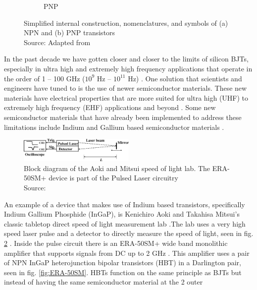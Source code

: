 \documentclass[conference]{IEEEtran}
\begin{document}
\begin{figure}[htbp]
\begin{subfigure}[b]{0.2\textwidth}
        \caption{PNP}
    \end{subfigure}
    \hspace*{\fill}
    \caption{Simplified internal construction, nomenclatures, and symbols of (a) NPN and (b) PNP transistors
    \\ Source: Adapted from \cite{sze_physics_2007}}
    \label{fig:transistor-block}
\end{figure}

In the past decade we have gotten closer and closer to the limits of silicon BJTs, especially in ultra high and
extremely high frequency applications that operate in the order of 1 – 100 GHz ($10^{9}$ Hz – $10^{11}$ Hz)
\cite{Schwierz2007}. One solution that scientists and engineers have tuned to is the use of newer semiconductor
materials. These new materials have electrical properties that are more suited for ultra high (UHF) to extremely high frequency (EHF)
applications and beyond \cite{Keyes2005}. Some new semiconductor materials that have already been implemented to
address these limitations include Indium and Gallium based semiconductor materials \cite{Schwierz2007}.

\begin{figure}[htbp]
    \centerline{\includegraphics[width=0.5\textwidth]{figures/speed-of-light.jpeg}}
    \caption{Block diagram of the Aoki and Mitsui speed of light lab.
    The ERA-50SM+ device is part of the Pulsed Laser circuitry \\ Source: \cite{Aoki2008}}
    \label{fig:speed-of-light}
\end{figure}

An example of a device that makes use of Indium based transistors, specifically Indium Gallium Phosphide (InGaP),
is Kenichiro Aoki and Takahisa Mitsui's classic tabletop direct speed of light measurement lab \cite{Aoki2008}.The lab uses a
very high speed laser pulse and a detector to directly measure the speed of light, seen in fig. \ref{fig:speed-of-light} . Inside
the pulse circuit there is an ERA-50SM+ wide band monolithic amplifier that supports signals from DC up to 2 GHz \cite{ERA-50SM+}.
This amplifier uses a pair of NPN InGaP heterojunction bipolar transistors (HBT) in a Darlington pair, seen in fig.
\ref{fig:ERA-50SM}. HBTs function on the same principle as BJTs but instead of having the same semiconductor material at the 2 outer
\end{document}
